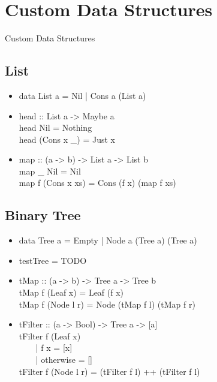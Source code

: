 \documentclass{beamer}                  %
\newcommand{\srule}{
	\rule{\textwidth}{1pt}\\
}
\newlength{\subsecwidth}
\newenvironment{slide}{
	\begin{frame} %
	\settowidth{\subsecwidth}{\insertsubsection} %
	\ifthenelse{\dimtest{\subsecwidth}{<}{1pt}}{ %
		\frametitle{\insertsection\\             %
		\vspace{-1ex}                            %
		\color{fore}\srule                       %
		\par                                     %
		\vspace{-3ex}                            %
		}
	}{                                           %
		\frametitle{\insertsection\ -- \insertsubsection\\ %
		\vspace{-1ex}                            %
		\color{fore}\srule                       %
		\par                                     %
		\vspace{-3ex}                            %
		}
	}
	\Large                                       %
}{
	\end{frame}
}
\newcommand{\titleslide}[1]{
	\section{#1}             %
	\begin{slide}
		\begin{center}
			\color{comments}
			\Huge            %
			#1               %
		\end{center}
	\end{slide}
}
\begin{document}
\titleslide{Custom Data Structures}
\subsection{List}

\begin{slide}
  \begin{itemize}
    \item data List a = Nil | Cons a (List a)
    \item
      head :: List a -> Maybe a\\
      head Nil        = Nothing\\
      head (Cons x \_) = Just x
    \item
      map :: (a -> b) -> List a -> List b\\
      map \_ Nil        = Nil\\
      map f (Cons x xs) = Cons (f x) (map f xs)
  \end{itemize}
\end{slide}

\subsection{Binary Tree}
\begin{slide}
  \begin{itemize}
    \item data Tree a = Empty | Node a (Tree a) (Tree a)
    \item testTree = TODO
    \item
      tMap :: (a -> b) -> Tree a -> Tree b\\
      tMap f (Leaf x)   = Leaf (f x)\\
      tMap f (Node l r) = Node (tMap f l) (tMap f r)
  \end{itemize}
\end{slide}

\begin{slide}
  \begin{itemize}
    \item
      tFilter :: (a -> Bool) -> Tree a -> [a]\\
      tFilter f (Leaf x)\\
      ~~~~| f x = [x]\\
      ~~~~| otherwise = []\\
      tFilter f (Node l r) = (tFilter f l) ++ (tFilter f l)
  \end{itemize}
\end{slide}
\end{document}
